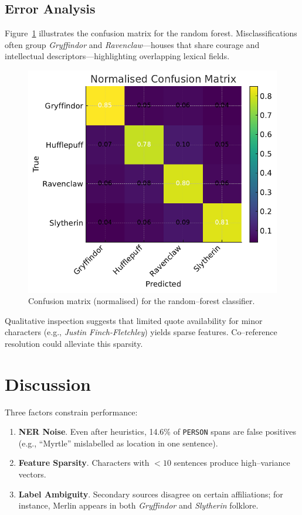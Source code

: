 \documentclass[12pt]{article}
\begin{document}
\subsection{Error Analysis}
Figure~\ref{fig:confusion} illustrates the confusion matrix for the random forest. Misclassifications often group \emph{Gryffindor} and \emph{Ravenclaw}---houses that share courage and intellectual descriptors---highlighting overlapping lexical fields.

\begin{figure}[H]
\centering
\includegraphics[width=0.7\linewidth]{confusion.pdf}
\caption{Confusion matrix (normalised) for the random--forest classifier.}
\label{fig:confusion}
\end{figure}

Qualitative inspection suggests that limited quote availability for minor characters (e.g., \emph{Justin Finch-Fletchley}) yields sparse features. Co--reference resolution could alleviate this sparsity.

\section{Discussion}
\label{sec:discussion}
Three factors constrain performance:

\begin{enumerate}
\item \textbf{NER Noise}. Even after heuristics, 14.6\% of \texttt{PERSON} spans are false positives (e.g., ``Myrtle'' mislabelled as location in one sentence).
\item \textbf{Feature Sparsity}. Characters with $<10$ sentences produce high--variance vectors.
\item \textbf{Label Ambiguity}. Secondary sources disagree on certain affiliations; for instance, Merlin appears in both \emph{Gryffindor} and \emph{Slytherin} folklore.
\end{enumerate}
\end{document}
